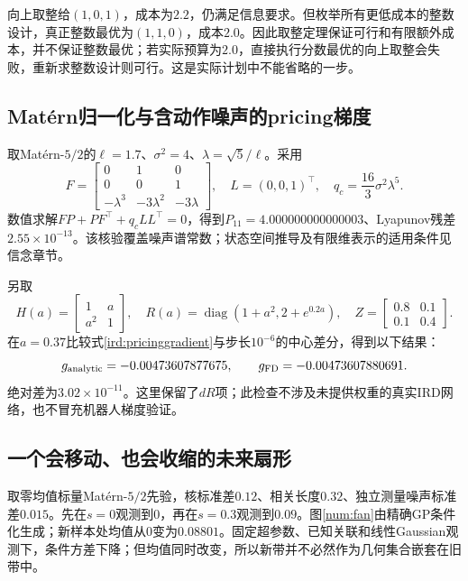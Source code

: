 \documentclass[11pt,a4paper]{article}
\numberwithin{equation}{section}
\theoremstyle{definition}
\DeclareMathOperator{\diag}{diag}
\begin{document}
向上取整给$(1,0,1)$，成本为$2.2$，仍满足信息要求。但枚举所有更低成本的整数设计，真正整数最优为$(1,1,0)$，成本$2.0$。因此取整定理保证可行和有限额外成本，并不保证整数最优；若实际预算为$2.0$，直接执行分数最优的向上取整会失败，重新求整数设计则可行。这是实际计划中不能省略的一步。

\subsection{Mat\'ern归一化与含动作噪声的pricing梯度}
取Mat\'ern-$5/2$的$\ell=1.7$、$\sigma^2=4$、$\lambda=\sqrt5/\ell$。采用
\begin{equation}
 F=\begin{bmatrix}0&1&0\\0&0&1\\-\lambda^3&-3\lambda^2&-3\lambda\end{bmatrix},
 \quad L=(0,0,1)^\top,\quad q_c=\frac{16}{3}\sigma^2\lambda^5.
\end{equation}
数值求解$FP+PF^\top+q_cLL^\top=0$，得到$P_{11}=4.000000000000003$、Lyapunov残差$2.55\times10^{-13}$。该核验覆盖噪声谱常数；状态空间推导及有限维表示的适用条件见信念章节。

另取
\begin{equation}
 H(a)=\begin{bmatrix}1&a\\a^2&1\end{bmatrix},\quad
 R(a)=\diag(1+a^2,2+e^{0.2a}),\quad
 Z=\begin{bmatrix}0.8&0.1\\0.1&0.4\end{bmatrix}.
\end{equation}
在$a=0.37$比较式\eqref{ird:pricinggradient}与步长$10^{-6}$的中心差分，得到以下结果：
\begin{equation}
 g_{\rm analytic}=-0.00473607877675,\qquad
 g_{\rm FD}=-0.00473607880691.
\end{equation}
绝对差为$3.02\times10^{-11}$。这里保留了$dR$项；此检查不涉及未提供权重的真实IRD网络，也不冒充机器人梯度验证。

\subsection{一个会移动、也会收缩的未来扇形}
取零均值标量Mat\'ern-$5/2$先验，核标准差$0.12$、相关长度$0.32$、独立测量噪声标准差$0.015$。先在$s=0$观测到$0$，再在$s=0.3$观测到$0.09$。图\ref{num:fan}由精确GP条件化生成；新样本处均值从$0$变为$0.08801$。固定超参数、已知关联和线性Gaussian观测下，条件方差下降；但均值同时改变，所以新带并不必然作为几何集合嵌套在旧带中。
\end{document}

